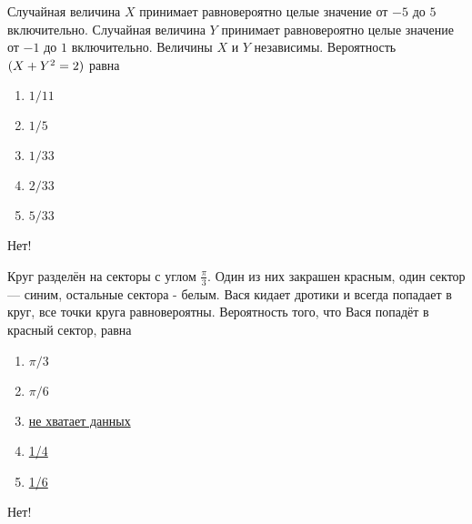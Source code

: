 \documentclass[t]{beamer}
\let\P\relax
\DeclareMathOperator{\P}{\mathbb{P}}
\begin{document}
 \begin{frame} \label{8-No} 
\begin{block}{8} 

  Случайная величина $X$ принимает равновероятно целые значение от $-5$ до $5$ включительно. Случайная величина $Y$ принимает равновероятно целые значение от $-1$ до $1$ включительно. Величины $X$ и $Y$ независимы. Вероятность $\P(X+Y^2=2)$ равна
  


 \end{block} 
\begin{enumerate} 
\item[] \hyperlink{8-Yes}{\beamergotobutton{} $1/11$}
\item[] \hyperlink{8-No}{\beamergotobutton{} $1/5$}
\item[] \hyperlink{8-No}{\beamergotobutton{} $1/33$}
\item[] \hyperlink{8-No}{\beamergotobutton{} $2/33$}
\item[] \hyperlink{8-No}{\beamergotobutton{} $5/33$}
\end{enumerate} 

 \alert{Нет!} 
\end{frame} 


 \begin{frame} \label{9-No} 
\begin{block}{9} 

Круг разделён на секторы с углом $\frac{\pi}{3}$. Один из них закрашен красным, один сектор — синим, остальные сектора - белым. Вася кидает дротики и всегда попадает в круг, все точки круга равновероятны. Вероятность того, что Вася попадёт в красный сектор, равна


 \end{block} 
\begin{enumerate} 
\item[] \hyperlink{9-No}{\beamergotobutton{} $\pi / 3$}
\item[] \hyperlink{9-No}{\beamergotobutton{} $\pi / 6$}
\item[] \hyperlink{9-No}{\beamergotobutton{} не хватает данных}
\item[] \hyperlink{9-No}{\beamergotobutton{} 1/4}
\item[] \hyperlink{9-Yes}{\beamergotobutton{} 1/6}
\end{enumerate} 

 \alert{Нет!} 
\end{frame} 
\end{document}
